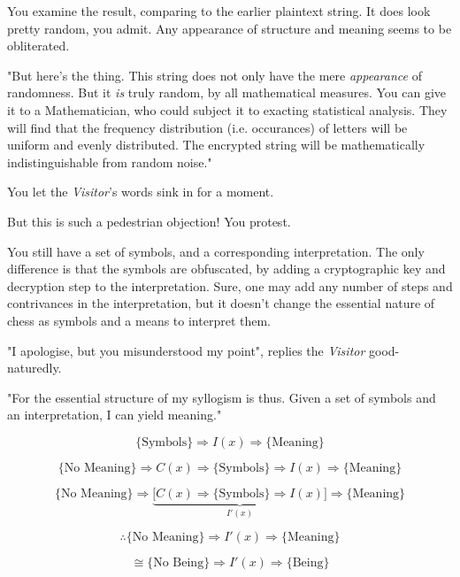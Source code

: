 You examine the result, comparing to the earlier plaintext string. It does look pretty random, you admit. Any appearance of structure and meaning seems to be obliterated.

"But here's the thing. This string does not only have the mere \emph{appearance} of randomness. But it \emph{is} truly random, by all mathematical measures. You can give it to a Mathematician, who could subject it to exacting statistical analysis. They will find that the frequency distribution (i.e. occurances) of letters will be uniform and evenly distributed. The encrypted string will be mathematically indistinguishable from random noise."

You let the \emph{Visitor}'s words sink in for a moment.

But this is such a pedestrian objection! You protest.

You still have a set of symbols, and a corresponding interpretation. The only difference is that the symbols are obfuscated, by adding a cryptographic key and decryption step to the interpretation. Sure, one may add any number of steps and contrivances in the interpretation, but it doesn't change the essential nature of chess as symbols and a means to interpret them.

"I apologise, but you misunderstood my point", replies the \emph{Visitor} good-naturedly.

"For the essential structure of my syllogism is thus. Given a set of symbols and an interpretation, I can yield meaning."

\begin{equation*}
  \{\text{Symbols}\} \Rightarrow I(x) \Rightarrow \{\text{Meaning}\}
\end{equation*}

\begin{equation*}
  \{\text{No Meaning}\} \Rightarrow C(x) \Rightarrow \{\text{Symbols}\} \Rightarrow I(x) \Rightarrow \{\text{Meaning}\}
\end{equation*}

\begin{equation*}
  \{\text{No Meaning}\} \Rightarrow \underbrace{ \big[ C(x) \Rightarrow \{\text{Symbols}\} \Rightarrow I(x) \big] }_{I'(x)} \Rightarrow \{\text{Meaning}\}
\end{equation*}

\begin{equation*}
  \therefore \{\text{No Meaning}\} \Rightarrow I'(x) \Rightarrow \{\text{Meaning}\}
\end{equation*}

\begin{equation*}
  \cong \{\text{No Being}\} \Rightarrow I'(x) \Rightarrow \{\text{Being}\}
\end{equation*}

